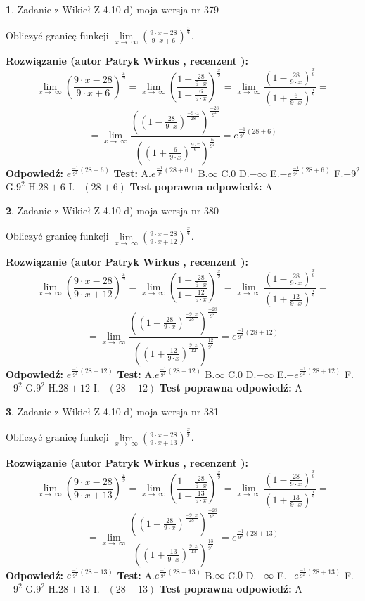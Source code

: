 \documentclass[12pt, a4paper]{article}
\theoremstyle{definition} %
\newtheorem{zad}{}
\newcommand{\zadStart}[1]{\begin{zad}#1\newline}
\newcommand{\zadStop}{\end{zad}}
\newcommand{\rozwStart}[2]{\noindent \textbf{Rozwiązanie (autor #1 , recenzent #2): }\newline}
\newcommand{\rozwStop}{\newline}
\newcommand{\odpStart}{\noindent \textbf{Odpowiedź:}\newline}
\newcommand{\odpStop}{\newline}
\newcommand{\testStart}{\noindent \textbf{Test:}\newline}
\newcommand{\testStop}{\newline}
\newcommand{\kluczStart}{\noindent \textbf{Test poprawna odpowiedź:}\newline}
\newcommand{\kluczStop}{\newline}
\begin{document}
\zadStart{Zadanie z Wikieł Z 4.10 d) moja wersja nr 379}


Obliczyć granicę funkcji  $\lim\limits_{x\to\ \infty}(\frac{9\cdot x-28}{9\cdot x+6})^{\frac{x}{9}}$.
\zadStop
\rozwStart{Patryk Wirkus}{}
$$\lim\limits_{x\to\ \infty}(\frac{9\cdot x-28}{9\cdot x+6})^{\frac{x}{9}} = \lim\limits_{x\to\ \infty}(\frac{1-\frac{28}{9\cdot x}}{1+\frac{6}{9\cdot x}})^{\frac{x}{9}}=\lim\limits_{x\to\ \infty}\frac{(1-\frac{28}{9\cdot x})^{\frac{x}{9}}}{(1+\frac{6}{9\cdot x})^{\frac{x}{9}}}=$$
$$=\lim\limits_{x\to\ \infty}\frac{((1-\frac{28}{9\cdot x})^{\frac{-9\cdot x}{28}})^{\frac{-28}{9^{2}}}}{((1+\frac{6}{9\cdot x})^{\frac{9\cdot x}{6}})^{\frac{6}{9^{2}}}}=e^{\frac{-1}{9^{2}}(28+6)}$$
\rozwStop
\odpStart
$e^{\frac{-1}{9^{2}}(28+6)}$
\odpStop
\testStart
A.$e^{\frac{-1}{9^{2}}(28+6)}$ B.$\infty$ C.$0$ D.$-\infty$ E.$-e^{\frac{-1}{9^{2}}(28+6)}$
F.$-9^{2}$ G.$9^{2}$
H.$28+6$
I.$-(28+6)$
\testStop
\kluczStart
A
\kluczStop



\zadStart{Zadanie z Wikieł Z 4.10 d) moja wersja nr 380}


Obliczyć granicę funkcji  $\lim\limits_{x\to\ \infty}(\frac{9\cdot x-28}{9\cdot x+12})^{\frac{x}{9}}$.
\zadStop
\rozwStart{Patryk Wirkus}{}
$$\lim\limits_{x\to\ \infty}(\frac{9\cdot x-28}{9\cdot x+12})^{\frac{x}{9}} = \lim\limits_{x\to\ \infty}(\frac{1-\frac{28}{9\cdot x}}{1+\frac{12}{9\cdot x}})^{\frac{x}{9}}=\lim\limits_{x\to\ \infty}\frac{(1-\frac{28}{9\cdot x})^{\frac{x}{9}}}{(1+\frac{12}{9\cdot x})^{\frac{x}{9}}}=$$
$$=\lim\limits_{x\to\ \infty}\frac{((1-\frac{28}{9\cdot x})^{\frac{-9\cdot x}{28}})^{\frac{-28}{9^{2}}}}{((1+\frac{12}{9\cdot x})^{\frac{9\cdot x}{12}})^{\frac{12}{9^{2}}}}=e^{\frac{-1}{9^{2}}(28+12)}$$
\rozwStop
\odpStart
$e^{\frac{-1}{9^{2}}(28+12)}$
\odpStop
\testStart
A.$e^{\frac{-1}{9^{2}}(28+12)}$ B.$\infty$ C.$0$ D.$-\infty$ E.$-e^{\frac{-1}{9^{2}}(28+12)}$
F.$-9^{2}$ G.$9^{2}$
H.$28+12$
I.$-(28+12)$
\testStop
\kluczStart
A
\kluczStop



\zadStart{Zadanie z Wikieł Z 4.10 d) moja wersja nr 381}


Obliczyć granicę funkcji  $\lim\limits_{x\to\ \infty}(\frac{9\cdot x-28}{9\cdot x+13})^{\frac{x}{9}}$.
\zadStop
\rozwStart{Patryk Wirkus}{}
$$\lim\limits_{x\to\ \infty}(\frac{9\cdot x-28}{9\cdot x+13})^{\frac{x}{9}} = \lim\limits_{x\to\ \infty}(\frac{1-\frac{28}{9\cdot x}}{1+\frac{13}{9\cdot x}})^{\frac{x}{9}}=\lim\limits_{x\to\ \infty}\frac{(1-\frac{28}{9\cdot x})^{\frac{x}{9}}}{(1+\frac{13}{9\cdot x})^{\frac{x}{9}}}=$$
$$=\lim\limits_{x\to\ \infty}\frac{((1-\frac{28}{9\cdot x})^{\frac{-9\cdot x}{28}})^{\frac{-28}{9^{2}}}}{((1+\frac{13}{9\cdot x})^{\frac{9\cdot x}{13}})^{\frac{13}{9^{2}}}}=e^{\frac{-1}{9^{2}}(28+13)}$$
\rozwStop
\odpStart
$e^{\frac{-1}{9^{2}}(28+13)}$
\odpStop
\testStart
A.$e^{\frac{-1}{9^{2}}(28+13)}$ B.$\infty$ C.$0$ D.$-\infty$ E.$-e^{\frac{-1}{9^{2}}(28+13)}$
F.$-9^{2}$ G.$9^{2}$
H.$28+13$
I.$-(28+13)$
\testStop
\kluczStart
A
\kluczStop
\end{document}
